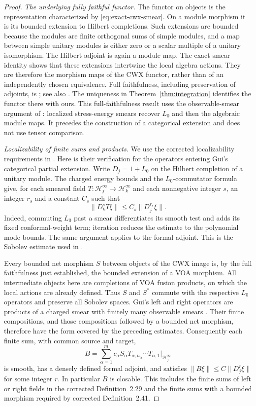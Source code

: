 \begin{proof}
\smallskip
\noindent\emph{The underlying fully faithful functor.}
The functor on objects is the representation characterized by
\eqref{eq:exact-cwx-smear}.  On a module morphism it is its bounded
extension to Hilbert completions.  Such extensions are bounded because
the modules are finite orthogonal sums of simple modules, and a map
between simple unitary modules is either zero or a scalar multiple
of a unitary isomorphism.  The Hilbert adjoint is again a module map.
The exact smear identity shows that these extensions intertwine the
local algebra actions.  They are therefore the morphism maps of the
CWX functor, rather than of an independently chosen equivalence.
Full faithfulness, including preservation of adjoints, is
\cite[Theorem~3.17]{GuiUnbounded}; see also
\cite[Theorem~4.24]{GuiExtensions}.  The uniqueness in
Theorem~\ref{thm:integration} identifies the functor there with ours.
This full-faithfulness result uses the observable-smear argument of
\cite[Theorem~4.3]{GuiUnitaryII}: localized stress-energy smears recover
$L_0$ and then the algebraic module maps. It precedes the construction
of a categorical extension and does not use tensor comparison.

\smallskip
\noindent\emph{Localizability of finite sums and products.}
We use the corrected localizability requirements in
\cite[item~3]{GuiUnboundedErrata}. Here is their verification for
the operators entering Gui's categorical partial extension.
Write $D_j=1+L_0$ on the Hilbert completion of a unitary module.
The charged energy bounds and the $L_0$-commutator formula give, for
each smeared field $T:\mathcal H_j^\infty\to\mathcal H_k^\infty$
and each nonnegative integer $s$, an integer $r_s$ and a constant $C_s$
such that
\[
 \|D_k^sT\xi\|\leq C_s\|D_j^{r_s}\xi\|.
\]
Indeed, commuting $L_0$ past a smear differentiates its smooth test
and adds its fixed conformal-weight term; iteration reduces the
estimate to the polynomial mode bounds. The same argument applies
to the formal adjoint. This is the Sobolev estimate used in
\cite[Section~3.1 and Proposition~3.2]{GuiUnbounded}.

Every bounded net morphism $S$ between objects of the CWX image is,
by the full faithfulness just established, the bounded extension of
a VOA morphism. All intermediate objects here are completions of VOA
fusion products, on which the local actions are already defined. Thus
$S$ and $S^*$ commute with the respective $L_0$ operators and preserve
all Sobolev spaces. Gui's left and right operators are products of a
charged smear with finitely many observable smears
\cite[Equations~(3.18)--(3.19)]{GuiUnbounded}. Their finite compositions,
and those compositions followed by a bounded net morphism, therefore
have the form covered by the preceding estimates. Consequently each
finite sum, with common source and target,
\[
 B=\sum_{\alpha=1}^{m}c_\alpha S_\alpha
       T_{\alpha,n_\alpha}\cdots T_{\alpha,1}
       \big|_{\mathcal H_j^\infty}
\]
is smooth, has a densely defined formal adjoint, and satisfies
$\|B\xi\|\leq C\|D_j^r\xi\|$ for some integer $r$.
In particular $B$ is closable. This includes the finite sums of left
or right fields in the corrected Definition~2.29 and the finite
sums with a bounded morphism required by corrected Definition~2.41.


\end{proof}
